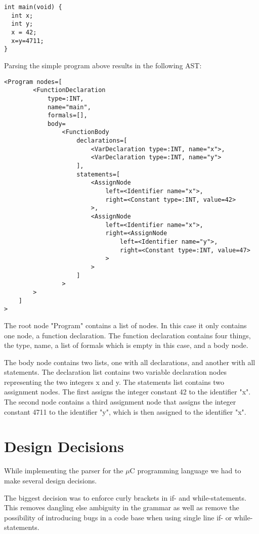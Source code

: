 \begin{lstlisting}
int main(void) {
  int x;
  int y;
  x = 42;
  x=y=4711;
}
\end{lstlisting}

Parsing the simple program above results in the following AST:

\begin{verbatim}
<Program nodes=[
        <FunctionDeclaration
            type=:INT,
            name="main",
            formals=[],
            body=
                <FunctionBody
                    declarations=[
                        <VarDeclaration type=:INT, name="x">,
                        <VarDeclaration type=:INT, name="y">
                    ],
                    statements=[
                        <AssignNode
                            left=<Identifier name="x">,
                            right=<Constant type=:INT, value=42>
                        >,
                        <AssignNode
                            left=<Identifier name="x">,
                            right=<AssignNode
                                left=<Identifier name="y">,
                                right=<Constant type=:INT, value=47>
                            >
                        >
                    ]
                >
        >
    ]
>
\end{verbatim}

The root node "Program" contains a list of nodes. In this case it only contains one node, a function declaration. The function declaration contains four things, the type, name, a list of formals which is empty in this case, and a body node.

The body node contains two lists, one with all declarations, and another with all statements. The declaration list contains two variable declaration nodes representing the two integers x and y. The statements list contains two assignment nodes. The first assigns the integer constant 42 to the identifier "x". The second node contains a third assignment node that assigns the integer constant 4711 to the identifier "y", which is then assigned to the identifier "x".

\section{Design Decisions}
While implementing the parser for the $\mu$C programming language we had to make several design decisions.

The biggest decision was to enforce curly brackets in if- and while-statements. This removes dangling else ambiguity in the grammar as well as remove the possibility of introducing bugs in a code base when using single line if- or while-statements.

